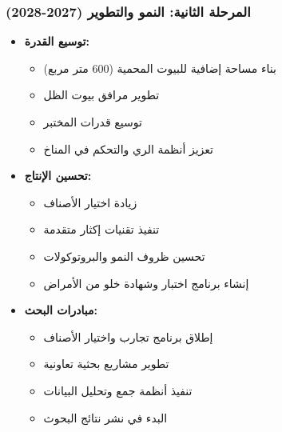 \subsubsection{المرحلة الثانية: النمو والتطوير (2027-2028)}
\begin{itemize}
    \item \textbf{توسيع القدرة:}
    \begin{itemize}
        \item بناء مساحة إضافية للبيوت المحمية (600 متر مربع)
        \item تطوير مرافق بيوت الظل
        \item توسيع قدرات المختبر
        \item تعزيز أنظمة الري والتحكم في المناخ
    \end{itemize}
    
    \item \textbf{تحسين الإنتاج:}
    \begin{itemize}
        \item زيادة اختيار الأصناف
        \item تنفيذ تقنيات إكثار متقدمة
        \item تحسين ظروف النمو والبروتوكولات
        \item إنشاء برنامج اختبار وشهادة خلو من الأمراض
    \end{itemize}
    
    \item \textbf{مبادرات البحث:}
    \begin{itemize}
        \item إطلاق برنامج تجارب واختيار الأصناف
        \item تطوير مشاريع بحثية تعاونية
        \item تنفيذ أنظمة جمع وتحليل البيانات
        \item البدء في نشر نتائج البحوث
    \end{itemize}
\end{itemize}

